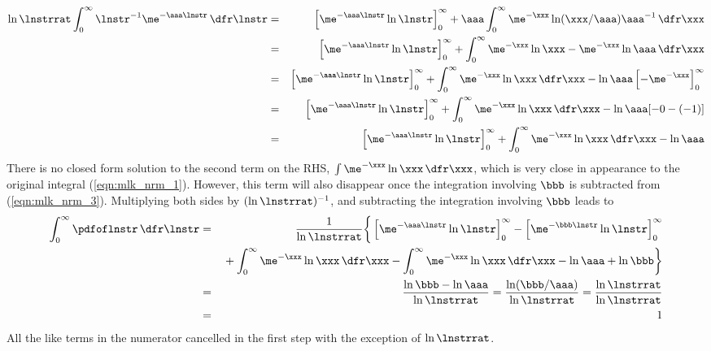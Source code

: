 \documentclass[12pt]{article}
\begin{document}
\begin{eqnarray}
\ln \lnstrrat \int_{0}^{\infty} \lnstr^{-1} \me^{-\aaa \lnstr} \,\dfr\lnstr 
& = &
\left[ \me^{-\aaa\lnstr} \ln \lnstr \right]_{0}^{\infty}
+ \aaa \int_{0}^{\infty} \me^{-\xxx} \ln (\xxx/\aaa) \aaa^{-1} \,\dfr\xxx
\nonumber \\
& = &
\left[ \me^{-\aaa\lnstr} \ln \lnstr \right]_{0}^{\infty}
+ \int_{0}^{\infty} \me^{-\xxx} \ln \xxx - \me^{-\xxx} \ln \aaa \,\dfr\xxx
\nonumber \\
& = &
\left[ \me^{-\aaa\lnstr} \ln \lnstr \right]_{0}^{\infty}
+ \int_{0}^{\infty} \me^{-\xxx} \ln \xxx \,\dfr\xxx
- \ln \aaa \left[ - \me^{-\xxx} \right]_{0}^{\infty}
\nonumber \\
& = &
\left[ \me^{-\aaa\lnstr} \ln \lnstr \right]_{0}^{\infty}
+ \int_{0}^{\infty} \me^{-\xxx} \ln \xxx \,\dfr\xxx
- \ln \aaa [ - 0 - (- 1 ) ] 
\nonumber \\
& = &
\left[ \me^{-\aaa\lnstr} \ln \lnstr \right]_{0}^{\infty}
+ \int_{0}^{\infty} \me^{-\xxx} \ln \xxx \,\dfr\xxx
- \ln \aaa
\label{eqn:mlk_nrm_3}
\end{eqnarray}
There is no closed form solution to the second term on the RHS, 
$\int \me^{-\xxx} \ln \xxx \,\dfr\xxx$, which is very close in
appearance to the original integral (\ref{eqn:mlk_nrm_1}).
However, this term will also disappear once the integration involving
$\bbb$ is subtracted from (\ref{eqn:mlk_nrm_3}).
Multiplying both sides by $(\ln \lnstrrat)^{-1}$, and subtracting
the integration involving $\bbb$ leads to
\begin{eqnarray}
\int_{0}^{\infty} \pdfoflnstr \,\dfr\lnstr 
& = &
\frac{1}{\ln\lnstrrat} \bigg\{
\left[ \me^{-\aaa\lnstr} \ln \lnstr \right]_{0}^{\infty}
-\left[ \me^{-\bbb\lnstr} \ln \lnstr \right]_{0}^{\infty}
\nonumber \\ & & {} %
+ \int_{0}^{\infty} \me^{-\xxx} \ln \xxx \,\dfr\xxx
- \int_{0}^{\infty} \me^{-\xxx} \ln \xxx \,\dfr\xxx
- \ln \aaa
+ \ln \bbb \bigg\} \nonumber \\
& = &
\frac{\ln \bbb - \ln \aaa}{\ln \lnstrrat} =
\frac{\ln (\bbb/\aaa)}{\ln \lnstrrat} =
\frac{\ln \lnstrrat}{\ln \lnstrrat} \nonumber \\
& = & 1 
\label{eqn:mlk_nrm_4}
\end{eqnarray}
All the like terms in the numerator cancelled in the first step with
the exception of $\ln \lnstrrat$.
\end{document}
